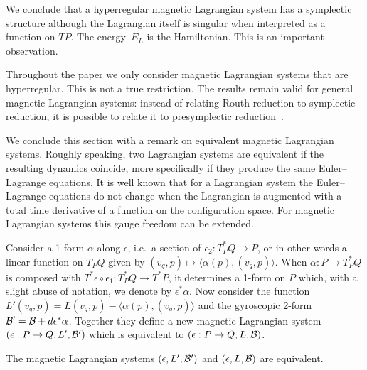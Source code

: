 \documentclass[pdftex]{sigma}
\newcommand{\B}{{\cal B}}
\newcommand{\e}{\epsilon}
\begin{document}
We conclude that a hyperregular magnetic Lagrangian system has a symplectic structure although the Lagrangian itself is singular when interpreted as a function on $TP$. The energy~$E_L$ is the Hamiltonian. This is an important observation.

\begin{remark} Throughout the paper we only consider magnetic Lagrangian systems that are hyperregular. This is not a true restriction. The results remain valid for general magnetic Lagrangian systems: instead of relating Routh reduction to symplectic reduction, it is possible to relate it to presymplectic reduction~\cite{presympred}. \end{remark}

\begin{remark} We conclude this section with a remark on equivalent magnetic Lagrangian systems. Roughly speaking, two Lagrangian systems are equivalent if the resulting dynamics coincide, more specif\/ically if they produce the same Euler--Lagrange equations. It is well known that for a Lagrangian system the Euler--Lagrange equations do not change when the Lagrangian is augmented with a total time derivative of a function on the conf\/iguration space. For magnetic Lagrangian systems this gauge freedom can be extended.

Consider a 1-form $\alpha$ along $\e$, i.e.\ a section of $\e_2:T^*_PQ\to P$, or in other words a linear function on $T_PQ$ given by $(v_q,p)\mapsto \langle \alpha(p),(v_q,p)\rangle$. When $\alpha:P\to T^*_PQ$ is composed with $T^*\e\circ\e_1:T^*_PQ\to T^*P$, it determines a 1-form on $P$ which, with a slight abuse of notation, we denote by $\e^*\alpha$. Now consider the function $L'(v_q,p)= L(v_q,p)- \langle \alpha(p),(v_q,p)\rangle$ and the gyroscopic 2-form $\B'= \B +d\e^*\alpha$.  Together they def\/ine a new magnetic Lagrangian system $(\e:P\to Q, L',\B ')$ which is equivalent to $(\e:P\to Q,L,\B)$.
\end{remark}

\begin{lemma}
 The magnetic Lagrangian systems $(\e, L',\B ')$ and $(\e,L,\B)$ are equivalent.
\end{lemma}
\end{document}
